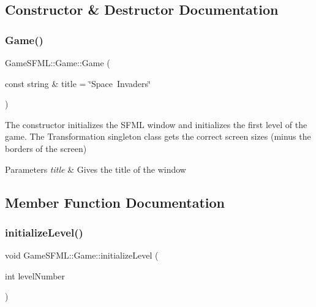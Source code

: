 \subsection{Constructor \& Destructor Documentation}
\mbox{\label{classGameSFML_1_1Game_a4ae981e788669fff50422ed9a1591db4}} 
\subsubsection{\texorpdfstring{Game()}{Game()}}
{\footnotesize\ttfamily Game\+S\+F\+M\+L\+::\+Game\+::\+Game (\begin{DoxyParamCaption}\item[{const string \&}]{title = {\ttfamily \char`\"{}Space~Invaders\char`\"{}} }\end{DoxyParamCaption})\hspace{0.3cm}{\ttfamily [explicit]}}

The constructor initializes the S\+F\+ML window and initializes the first level of the game. The Transformation singleton class gets the correct screen sizes (minus the borders of the screen) 
\begin{DoxyParams}{Parameters}
{\em title} & Gives the title of the window \\
\hline
\end{DoxyParams}


\subsection{Member Function Documentation}
\mbox{\label{classGameSFML_1_1Game_a79da94cd442e1b622b7880fc8862ed9e}} 
\subsubsection{\texorpdfstring{initialize\+Level()}{initializeLevel()}}
{\footnotesize\ttfamily void Game\+S\+F\+M\+L\+::\+Game\+::initialize\+Level (\begin{DoxyParamCaption}\item[{int}]{level\+Number }\end{DoxyParamCaption})}

